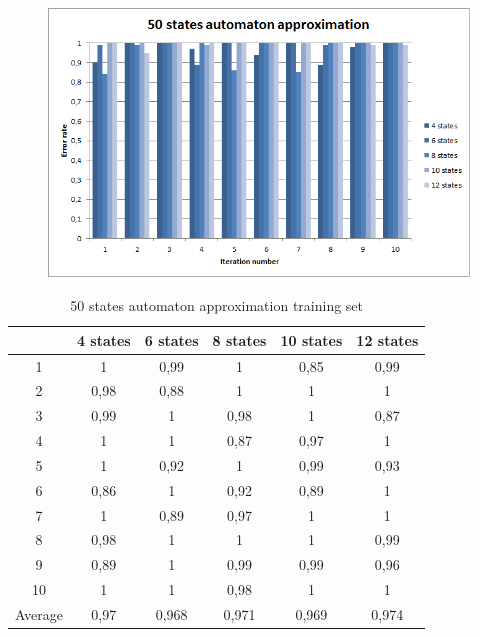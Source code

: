 \documentclass[runningheads,a4paper]{llncs}
\begin{document}
\begin{figure}
\centering
\includegraphics[scale=1]{4.png}
\end{figure}

\begin{table}[]
\centering
\caption{50 states automaton approximation training set}
\label{my-label}
\begin{tabular}{@{}cccccc@{}}
\toprule
        & 4 states & 6 states & 8 states & 10 states & 12 states    \\ \midrule
1       & 1        & 0,99     & 1        & 0,85      & 0,99 \\
2       & 0,98     & 0,88     & 1        & 1         & 1 \\
3       & 0,99     & 1        & 0,98     & 1         & 0,87 \\
4       & 1        & 1        & 0,87     & 0,97      & 1   \\
5       & 1        & 0,92     & 1        & 0,99      & 0,93   \\
6       & 0,86     & 1        & 0,92     & 0,89      & 1    \\
7       & 1        & 0,89     & 0,97     & 1         & 1    \\
8       & 0,98     & 1        & 1        & 1         & 0,99    \\
9       & 0,89     & 1        & 0,99     & 0,99      & 0,96 \\
10      & 1        & 1        & 0,98     & 1         & 1  \\
Average & 0,97    & 0,968     & 0,971    & 0,969     & 0,974  \\ \bottomrule
\end{tabular}
\end{table}
\end{document}
